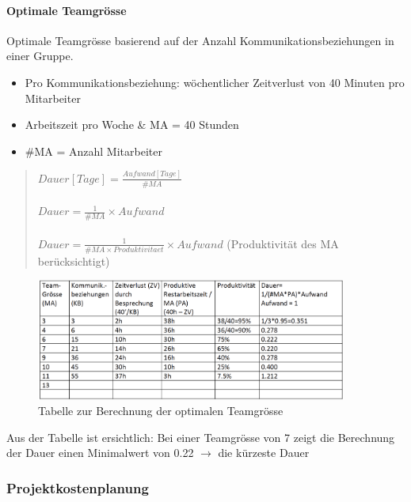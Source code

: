 \documentclass[a4paper]{article}
\begin{document}
			\paragraph{Optimale Teamgrösse}
			
			Optimale Teamgrösse basierend auf der Anzahl Kommunikationsbeziehungen in einer Gruppe.
			
			\begin{itemize}
				\item Pro Kommunikationsbeziehung: wöchentlicher Zeitverlust von 40 Minuten pro Mitarbeiter
				\item Arbeitszeit pro Woche \& MA = 40 Stunden
				\item \#MA = Anzahl Mitarbeiter
			\end{itemize}
		
			\begin{quote}
				$Dauer[Tage] = \frac{Aufwand[Tage]}{\#MA}$\\
				\\
				$Dauer = \frac{1}{\#MA} \times Aufwand$\\
				\\
				$Dauer = \frac{1}{\#MA \times Produktivitaet} \times Aufwand$ (Produktivität des MA berücksichtigt)
			\end{quote}
		
\newpage

			\begin{figure}[!htb]
				\centering
				\includegraphics[height=4cm]{img/pm/opt_team.png}
				\caption{Tabelle zur Berechnung der optimalen Teamgrösse}
				\label{fig:pm_opt_team}
			\end{figure}
			\noindent
			Aus der Tabelle ist ersichtlich: Bei einer Teamgrösse von 7 zeigt die Berechnung der Dauer einen Minimalwert von 0.22 $\rightarrow$ die kürzeste Dauer
			
		\subsubsection{Projektkostenplanung}
		
\end{document}
